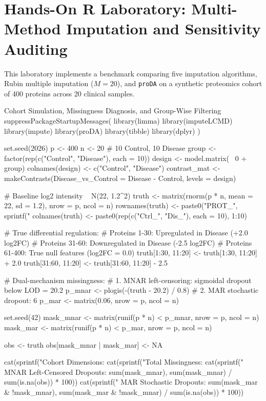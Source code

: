 \documentclass[11pt,oneside]{book}
\begin{document}
\section{Hands-On R Laboratory: Multi-Method Imputation and Sensitivity Auditing}
\label{sec:r_laboratory}

This laboratory implements a benchmark comparing five imputation algorithms, Rubin multiple imputation ($M=20$), and \texttt{proDA} on a synthetic proteomics cohort of 400 proteins across 20 clinical samples.

\begin{rchunk}{Cohort Simulation, Missingness Diagnosis, and Group-Wise Filtering}
suppressPackageStartupMessages({
  library(limma)
  library(imputeLCMD)
  library(impute)
  library(proDA)
  library(tibble)
  library(dplyr)
})

set.seed(2026)
p <- 400
n <- 20 # 10 Control, 10 Disease
group <- factor(rep(c("Control", "Disease"), each = 10))
design <- model.matrix(~ 0 + group)
colnames(design) <- c("Control", "Disease")
contrast_mat <- makeContrasts(Disease_vs_Control = Disease - Control, levels = design)

# Baseline log2 intensity ~ N(22, 1.2^2)
truth <- matrix(rnorm(p * n, mean = 22, sd = 1.2), nrow = p, ncol = n)
rownames(truth) <- paste0("PROT_", sprintf("%
colnames(truth) <- paste0(rep(c("Ctrl_", "Dis_"), each = 10), 1:10)

# True differential regulation:
# Proteins 1-30: Upregulated in Disease (+2.0 log2FC)
# Proteins 31-60: Downregulated in Disease (-2.5 log2FC)
# Proteins 61-400: True null features (log2FC = 0.0)
truth[1:30, 11:20]  <- truth[1:30, 11:20] + 2.0
truth[31:60, 11:20] <- truth[31:60, 11:20] - 2.5

# Dual-mechanism missingness:
# 1. MNAR left-censoring: sigmoidal dropout below LOD = 20.2
p_mnar <- plogis(-(truth - 20.2) / 0.8)
# 2. MAR stochastic dropout: 6%
p_mar <- matrix(0.06, nrow = p, ncol = n)

set.seed(42)
mask_mnar <- matrix(runif(p * n) < p_mnar, nrow = p, ncol = n)
mask_mar  <- matrix(runif(p * n) < p_mar,  nrow = p, ncol = n)

obs <- truth
obs[mask_mnar | mask_mar] <- NA

cat(sprintf("Cohort Dimensions: %
cat(sprintf("Total Missingness: %
cat(sprintf("  MNAR Left-Censored Dropouts: %
            sum(mask_mnar), sum(mask_mnar) / sum(is.na(obs)) * 100))
cat(sprintf("  MAR Stochastic Dropouts:    %
            sum(mask_mar & !mask_mnar), sum(mask_mar & !mask_mnar) / sum(is.na(obs)) * 100))


\end{rchunk}
\end{document}
